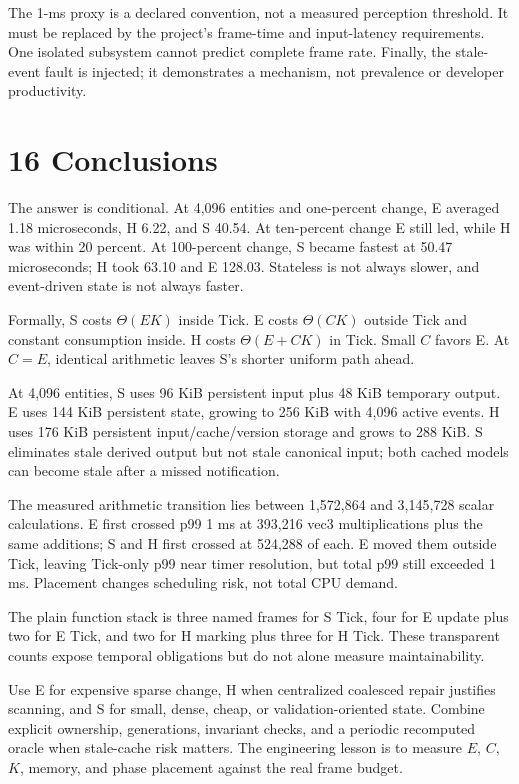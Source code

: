 The 1-ms proxy is a declared convention, not a measured perception threshold. It must be replaced by the project's frame-time and input-latency requirements. One isolated subsystem cannot predict complete frame rate. Finally, the stale-event fault is injected; it demonstrates a mechanism, not prevalence or developer productivity.

\section{16 Conclusions}

The answer is conditional. At 4,096 entities and one-percent change, E averaged 1.18 microseconds, H 6.22, and S 40.54. At ten-percent change E still led, while H was within 20 percent. At 100-percent change, S became fastest at 50.47 microseconds; H took 63.10 and E 128.03. Stateless is not always slower, and event-driven state is not always faster.

Formally, S costs \(\Theta(EK)\) inside Tick. E costs \(\Theta(CK)\) outside Tick and constant consumption inside. H costs \(\Theta(E+CK)\) in Tick. Small \(C\) favors E. At \(C=E\), identical arithmetic leaves S's shorter uniform path ahead.

At 4,096 entities, S uses 96 KiB persistent input plus 48 KiB temporary output. E uses 144 KiB persistent state, growing to 256 KiB with 4,096 active events. H uses 176 KiB persistent input/cache/version storage and grows to 288 KiB. S eliminates stale derived output but not stale canonical input; both cached models can become stale after a missed notification.

The measured arithmetic transition lies between 1,572,864 and 3,145,728 scalar calculations. E first crossed p99 1 ms at 393,216 vec3 multiplications plus the same additions; S and H first crossed at 524,288 of each. E moved them outside Tick, leaving Tick-only p99 near timer resolution, but total p99 still exceeded 1 ms. Placement changes scheduling risk, not total CPU demand.

The plain function stack is three named frames for S Tick, four for E update plus two for E Tick, and two for H marking plus three for H Tick. These transparent counts expose temporal obligations but do not alone measure maintainability.

Use E for expensive sparse change, H when centralized coalesced repair justifies scanning, and S for small, dense, cheap, or validation-oriented state. Combine explicit ownership, generations, invariant checks, and a periodic recomputed oracle when stale-cache risk matters. The engineering lesson is to measure \(E\), \(C\), \(K\), memory, and phase placement against the real frame budget.

